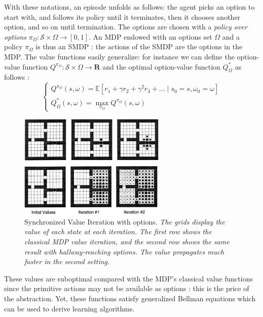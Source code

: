 \documentclass{article}
\newcommand{\Rr}{\mathbf{R}}
\newcommand{\Ee}{\mathbb{E}}
\begin{document}
With these notations, an episode unfolds as follows: the agent picks an option to start with, and follows its policy until it terminates, then it chooses another option, and so on until termination. The options are chosen with a \textit{policy over options} $\pi_\Omega : \mathcal{S} \times \Omega \rightarrow [0, 1]$. An MDP endowed with an options set $\Omega$ and a policy $\pi_\Omega$ is thus an SMDP : the actions of the SMDP are the options in the MDP.
The value functions easily generalize: for instance we can define the option-value function $Q^{\pi_\Omega} : \mathcal{S} \times \Omega \rightarrow \Rr$ and the optimal option-value function $Q^*_\Omega$ as follows :
\begin{equation}
\begin{cases}
Q^{\pi_\Omega}(s, \omega) = \Ee[r_1 + \gamma r_2 + \gamma^2 r_3 +  ... \mid s_0 = s, \omega_0 = \omega] \\
Q^*_\Omega(s, \omega) = \max_{\pi_\Omega} Q^{\pi_\Omega}(s, \omega)
\end{cases}
\end{equation}

\begin{figure}
    \centering
    \includegraphics[width=7cm]{images/SVI_options.png}
    \caption{Synchronized Value Iteration with options. \small \it The grids display the value of each state at each iteration. The first row shows the classical MDP value iteration, and the second row shows the same result with hallway-reaching options. The value propagates much faster in the second setting.}
    \label{fig:svi}
    \vspace{-1cm}
\end{figure}

These values are suboptimal compared with the MDP's classical value functions since the primitive actions may not be available as options : this is the price of the abstraction. Yet, these functions satisfy generalized Bellman equations which can be used to derive learning algorithms.
\end{document}
